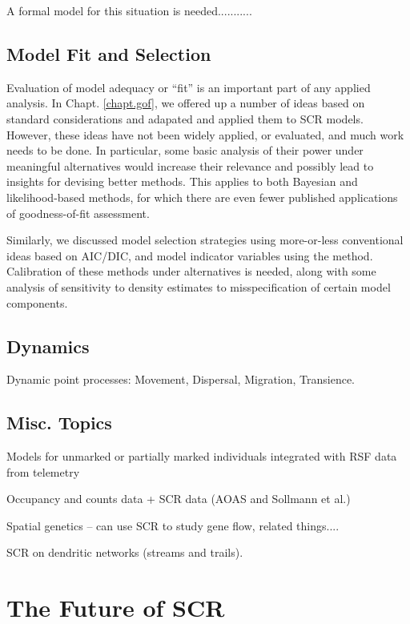 A formal model for this situation is needed...........









\subsection{Model Fit and Selection}

Evaluation of model adequacy or ``fit'' is an important part of any
applied analysis. In Chapt. \ref{chapt.gof}, we offered up a number of
ideas based on standard considerations and adapated and applied them
to SCR models.  However, these ideas have not been widely applied, or
evaluated, and much work needs to be done. In particular, some basic
analysis of their power under meaningful alternatives would increase
their relevance and possibly lead to insights for devising better
methods. This applies to both Bayesian and likelihood-based methods,
for which there are even fewer published applications of
goodness-of-fit assessment.

Similarly, we discussed model selection strategies using more-or-less
conventional ideas based on AIC/DIC, and model indicator variables
using the \citet{kuo_mallick:1998} method.  Calibration of these
methods under alternatives is needed, along with some analysis of
sensitivity to density estimates to misspecification of certain model
components.


\subsection{Dynamics}

Dynamic point processes:
Movement, Dispersal, Migration,
Transience.


\subsection{Misc. Topics}

Models for unmarked or partially marked individuals integrated with RSF data from telemetry

Occupancy and counts data + SCR data (AOAS and Sollmann et al.)

Spatial genetics  -- can use SCR to study gene flow, related things....

SCR on dendritic networks (streams and trails).


\section{The Future of SCR}

